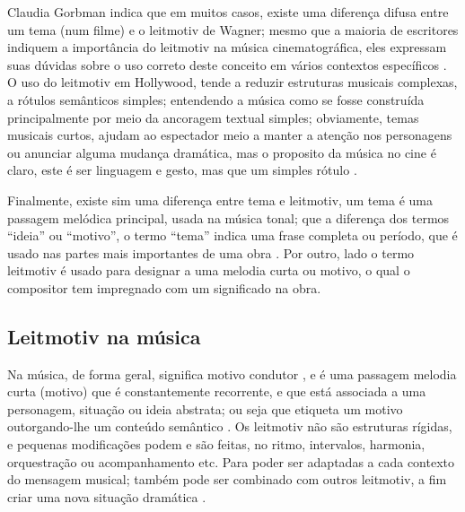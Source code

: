 Claudia Gorbman indica que em muitos casos, 
existe uma diferença difusa entre um tema (num filme) e o leitmotiv de Wagner;
mesmo que a maioria de escritores indiquem a importância do leitmotiv na música cinematográfica,
eles   expressam suas dúvidas sobre o uso correto deste conceito em vários contextos específicos \cite[pp. 190]{nasta2004perspective}.
O uso do leitmotiv em Hollywood, tende a reduzir estruturas musicais complexas, 
a rótulos semânticos simples; entendendo a música como se fosse construída principalmente por meio da ancoragem textual simples;
obviamente, temas musicais curtos, ajudam ao espectador meio a manter a atenção nos personagens ou  anunciar alguma mudança dramática,
mas o proposito da música no cine é claro, este é ser linguagem e  gesto, mas que um simples rótulo  \cite[pp. 195]{nasta2004perspective}.


Finalmente, existe sim uma diferença entre tema e leitmotiv, 
um tema é uma passagem melódica principal, usada na música tonal; 
que a diferença dos termos ``ideia'' ou ``motivo'', 
o termo ``tema'' indica uma frase completa ou período, 
que é usado nas partes mais importantes de uma obra \cite[pp. 1496]{latham2008diccionario}. 
Por outro, lado o termo leitmotiv é usado para designar a uma melodia curta ou motivo, 
o qual o compositor tem impregnado com um significado na obra. 

\subsection{Leitmotiv na música}

Na música, de forma geral,
significa motivo condutor \cite[pp. 230]{holst1998abc} \cite[pp. 465]{apel1969harvard}, 
e é uma passagem melodia curta (motivo) que é constantemente recorrente, e
que está associada a uma personagem, situação ou ideia abstrata;
ou seja que etiqueta um motivo outorgando-lhe  um conteúdo semântico \cite[pp. 230]{holst1998abc} \cite[pp. 7-8]{bribitzer2015understanding}.
Os leitmotiv não são estruturas rígidas, e pequenas modificações podem e são feitas,
no ritmo, intervalos, harmonia, orquestração ou acompanhamento  \cite[pp. 466]{apel1969harvard}
\cite[pp. 465]{apel1969harvard} \cite[pp. 188]{nasta2004perspective} etc. 
Para poder ser adaptadas a cada contexto do mensagem musical;
também pode ser combinado com outros leitmotiv, a fim criar uma nova situação dramática \cite[pp. 188]{nasta2004perspective}.







